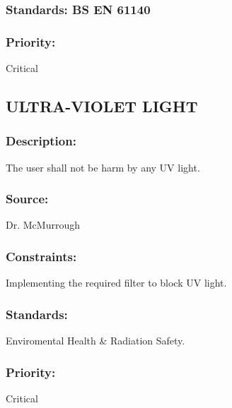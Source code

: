 \subsubsection{\textbf Standards: BS EN 61140}
\subsubsection{Priority:} 
	{Critical}

\subsection{\text  ULTRA-VIOLET LIGHT}
\subsubsection{Description:} 
	{The user shall not be harm by any UV light.}
\subsubsection{Source:} 
	{Dr. McMurrough}
\subsubsection{Constraints:} 
	{Implementing the required filter to block UV light.}
\subsubsection{Standards:} 
	{Enviromental Health & Radiation Safety.}
\subsubsection{Priority:} 
	{Critical}
